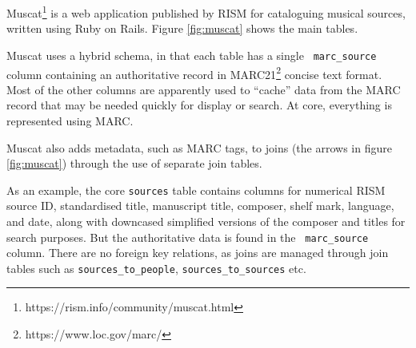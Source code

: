 \documentclass[sigconf, nonacm=true]{acmart}
\begin{document}
\begin{sloppypar}
  Muscat\footnote{https://rism.info/community/muscat.html} is a web
  application published by RISM for cataloguing musical sources,
  written using Ruby on Rails. Figure \ref{fig:muscat} shows the main
  tables.

  Muscat uses a hybrid schema, in that each table has a single {\tt
    marc\_source} column containing an authoritative record in
  MARC21\footnote{https://www.loc.gov/marc/} concise text format. Most
  of the other columns are apparently used to ``cache'' data from the
  MARC record that may be needed quickly for display or search. At
  core, everything is represented using MARC.

  Muscat also adds metadata, such as MARC tags, to joins (the arrows
  in figure \ref{fig:muscat}) through the use of separate join tables.
  
  As an example, the core {\tt sources} table contains columns for
  numerical RISM source ID, standardised title, manuscript title,
  composer, shelf mark, language, and date, along with downcased
  simplified versions of the composer and titles for search
  purposes. But the authoritative data is found in the {\tt
    marc\_source} column. There are no foreign key relations, as joins
  are managed through join tables such as {\tt sources\_to\_people},
  {\tt sources\_to\_sources} etc.
  
\end{sloppypar}
\end{document}

